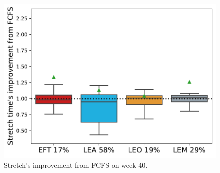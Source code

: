 \documentclass[sigconf,review,anonymous]{acmart}
\begin{document}
\begin{figure}[t]\centering\includegraphics[width=0.9\linewidth]{../MBSS/plot/Boxplot/byuser/box_plot_stretch_10-03-10-09_0.pdf}\caption{Stretch's improvement from FCFS on week 40.}\label{stretch.40}\end{figure}
\end{document}
